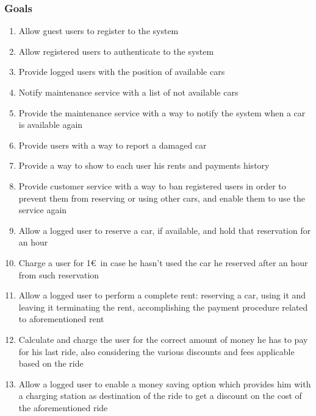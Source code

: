 	\subsubsection{Goals}
	\label{sec:goals}
	\begin{enumerate}[label=\textbf{G\arabic*}]
		\item \label{goal:register} Allow guest users to register to the system
		\item \label{goal:login}Allow registered users to authenticate to the system
		\item \label{goal:position}Provide logged users with the position of available cars
		\item \label{goal:notifyMaintenance} Notify maintenance service with a list of not available cars 
		\item \label{goal:maintenanceDone} Provide the maintenance service with a way to notify the system when a car is available again 
		\item \label{goal:needMaintenance} Provide users with a way to report a damaged car
		\item \label{goal:usersHistory} Provide a way to show to each user his rents and payments history
		\item \label{goal:banUnbanUsers} Provide customer service with a way to ban registered users in order to prevent them from reserving or using other cars, and enable them to use the service again
		\item \label{goal:carReservation} Allow a logged user to reserve a car, if available, and hold that reservation for an hour
		\item \label{goal:reservationFee} Charge a user for 1\euro\ in case he hasn't used the car he reserved after an hour from such reservation
		\item \label{goal:completeRent} Allow a logged user to perform a complete rent: reserving a car, using it and leaving it terminating the rent, accomplishing the payment procedure related to aforementioned rent
		\item \label{goal:calculateCost} Calculate and charge the user for the correct amount of money he has to pay for his last ride, also considering the various discounts and fees applicable based on the ride
		\item \label{goal:moneySavingOption}Allow a logged user to enable a money saving option which provides him with a charging station as destination of the ride to get a discount on the cost of the aforementioned ride
	\end{enumerate}

